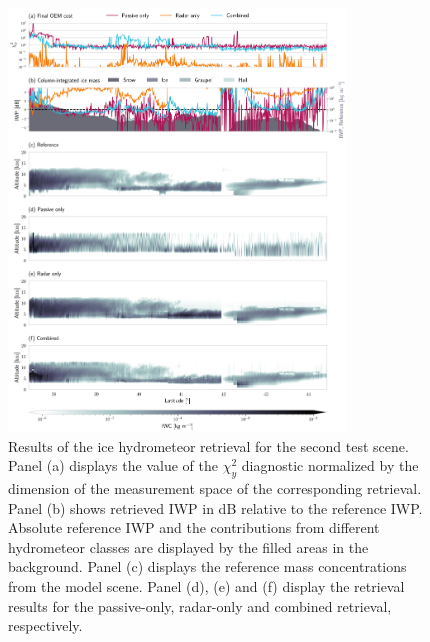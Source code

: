 \documentclass[journal abbreviation, manuscript]{copernicus}
\begin{document}
\begin{figure}
\centering
\includegraphics[width = 0.8\textwidth]{../plots/results_b_LargePlateAggregate}
\caption{Results of the ice hydrometeor retrieval for the second test scene.
  Panel (a) displays the value of the $\chi^2_y$ diagnostic normalized by the
  dimension of the measurement space of the corresponding retrieval. Panel (b)
  shows retrieved IWP in dB relative to the reference IWP. Absolute reference
  IWP and the contributions from different hydrometeor classes are displayed by
  the filled areas in the background. Panel (c) displays the reference mass
  concentrations from the model scene. Panel (d), (e) and (f) display the
  retrieval results for the passive-only, radar-only and combined retrieval,
  respectively.}
\label{fig:results_b}
\end{figure}
\end{document}

